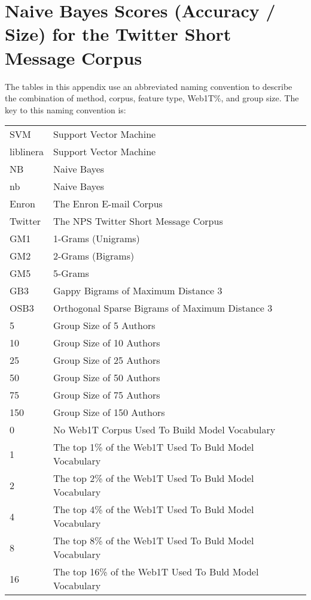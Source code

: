 \chapter{Naive Bayes Scores (Accuracy / Size) for the Twitter Short Message Corpus}

The tables in this appendix use an abbreviated naming convention to describe the combination of method, corpus, feature type, Web1T\%, and group size.  The key to this naming convention is:

\begin{center}
\begin{table}[htbp!]
	\begin{center}
	\begin{tabular}{ll}
	SVM & Support Vector Machine\\
	liblinera & Support Vector Machine\\
	NB & Naive Bayes\\
	nb & Naive Bayes\\
	
	Enron & The Enron E-mail Corpus\\
	Twitter & The NPS Twitter Short Message Corpus\\
	
	GM1 & 1-Grams (Unigrams)\\
	GM2 & 2-Grams (Bigrams)\\
	GM5 & 5-Grams\\
	GB3 & Gappy Bigrams of Maximum Distance 3\\
	OSB3 & Orthogonal Sparse Bigrams of Maximum Distance 3\\
		
	5 & Group Size of 5 Authors\\
	10 & Group Size of 10 Authors\\
	25 & Group Size of 25 Authors\\
	50 & Group Size of 50 Authors\\
	75 & Group Size of 75 Authors\\
	150 & Group Size of 150 Authors\\
	
	0 & No Web1T Corpus Used To Build Model Vocabulary\\
	1 & The top 1\% of the Web1T Used To Buld Model Vocabulary\\
	2 & The top 2\% of the Web1T Used To Buld Model Vocabulary\\
	4 & The top 4\% of the Web1T Used To Buld Model Vocabulary\\
	8 & The top 8\% of the Web1T Used To Buld Model Vocabulary\\
	16 & The top 16\% of the Web1T Used To Buld Model Vocabulary\\
	\end{tabular}
	\end{center}
\end{table}
\end{center}


